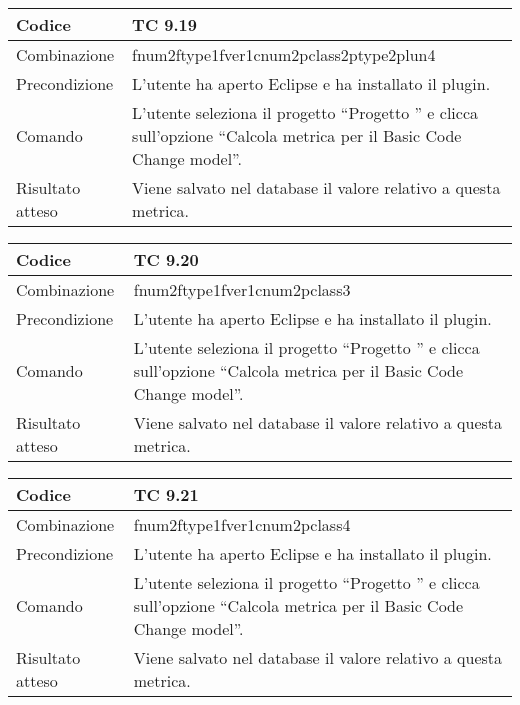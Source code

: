 \begin{table}[ht]
\begin{tabular}{|p{3cm}|p{9cm}|}
\hline
\cellcolor{lightgray}Codice				& TC 9.19								\\
\hline
\cellcolor{lightgray}Combinazione		& fnum2ftype1fver1cnum2pclass2ptype2plun4									\\
\hline
\cellcolor{lightgray}Precondizione		& L'utente ha aperto Eclipse e ha installato il plugin.		\\
\hline
\cellcolor{lightgray}Comando			& L'utente seleziona il progetto ``Progetto ''  e clicca sull'opzione ``Calcola metrica per il Basic Code Change model''.	\\
\hline
\cellcolor{lightgray}Risultato atteso	& Viene salvato nel database il valore relativo a questa metrica.\\
\hline
\end{tabular}
\end{table}

\begin{table}[ht]
\begin{tabular}{|p{3cm}|p{9cm}|}
\hline
\cellcolor{lightgray}Codice				& TC 9.20								\\
\hline
\cellcolor{lightgray}Combinazione		& fnum2ftype1fver1cnum2pclass3									\\
\hline
\cellcolor{lightgray}Precondizione		& L'utente ha aperto Eclipse e ha installato il plugin.		\\
\hline
\cellcolor{lightgray}Comando			& L'utente seleziona il progetto ``Progetto ''  e clicca sull'opzione ``Calcola metrica per il Basic Code Change model''.	\\
\hline
\cellcolor{lightgray}Risultato atteso	& Viene salvato nel database il valore relativo a questa metrica.\\
\hline
\end{tabular}
\end{table}

\begin{table}[ht]
\begin{tabular}{|p{3cm}|p{9cm}|}
\hline
\cellcolor{lightgray}Codice				& TC 9.21								\\
\hline
\cellcolor{lightgray}Combinazione		& fnum2ftype1fver1cnum2pclass4									\\
\hline
\cellcolor{lightgray}Precondizione		& L'utente ha aperto Eclipse e ha installato il plugin.		\\
\hline
\cellcolor{lightgray}Comando			& L'utente seleziona il progetto ``Progetto ''  e clicca sull'opzione ``Calcola metrica per il Basic Code Change model''.	\\
\hline
\cellcolor{lightgray}Risultato atteso	& Viene salvato nel database il valore relativo a questa metrica.\\
\hline
\end{tabular}
\end{table}

